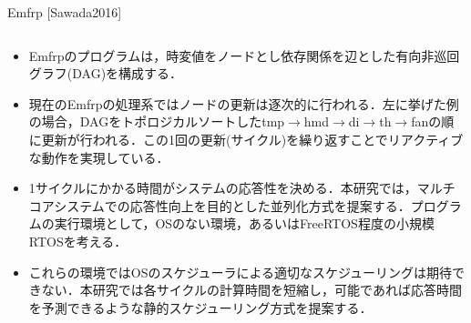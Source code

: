 \documentclass[dvipdfmx,final,t,12pt]{beamer}
\begin{document}
\begin{frame}[fragile]
    \begin{block}{Emfrp \small{[Sawada2016]}}
        \begin{columns}
            \begin{column}{0.45\textwidth}
                \begin{itemize}
                    \item Emfrpのプログラムは，時変値をノードとし依存関係を辺とした有向非巡回グラフ(DAG)を構成する．
                    \item 現在のEmfrpの処理系ではノードの更新は逐次的に行われる．左に挙げた例の場合，DAGをトポロジカルソートしたtmp$\rightarrow$hmd$\rightarrow$di$\rightarrow$th$\rightarrow$fanの順に更新が行われる．この1回の更新(サイクル)を繰り返すことでリアクティブな動作を実現している．
                    \item 1サイクルにかかる時間がシステムの応答性を決める．本研究では，マルチコアシステムでの応答性向上を目的とした並列化方式を提案する．プログラムの実行環境として，OSのない環境，あるいはFreeRTOS程度の小規模RTOSを考える．
                    \item これらの環境ではOSのスケジューラによる適切なスケジューリングは期待できない．本研究では各サイクルの計算時間を短縮し，可能であれば応答時間を予測できるような静的スケジューリング方式を提案する．
                \end{itemize}
            \end{column}
        \end{columns}
    \end{block}


\end{frame}
\end{document}
